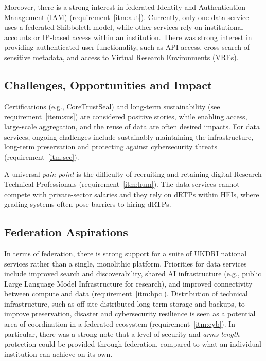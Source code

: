 \documentclass[11pt]{scrartcl}
\begin{document}
Moreover, there is a strong interest in federated Identity and Authentication Management (IAM) (requirement~\ref{itm:aut}). Currently, only one data service uses a federated Shibboleth model, while other services rely on institutional accounts or IP-based access within an institution. There was strong interest in providing authenticated user functionality, such as API access, cross-search of sensitive metadata, and access to Virtual Research Environments (VREs).

\subsection{Challenges, Opportunities and Impact}
Certifications (e.g., CoreTrustSeal) and long-term sustainability (see requirement~\ref{item:sus}) are considered positive stories, while enabling access, large-scale aggregation, and the reuse of data are often desired impacts.  For data services, ongoing challenges include sustainably maintaining the infrastructure, long-term preservation and protecting against cybersecurity threats (requirement~\ref{itm:sec}).

A universal \emph{pain point} is the difficulty of recruiting and retaining digital Research Technical Professionals (requirement~\ref{itm:hum}). The data services cannot compete with private-sector salaries and they rely on dRTPs within HEIs, where grading systems often pose barriers to hiring dRTPs. 

\subsection{Federation Aspirations}
In terms of federation, there is strong support for a suite of UKDRI national services rather than a single, monolithic platform. Priorities for data services include improved search and discoverability, shared AI infrastructure (e.g., public Large Language Model Infrastructure for research), and improved connectivity between compute and data (requirement~\ref{itm:hpc}). Distribution of technical infrastructure, such as off-site distributed long-term storage and backups, to improve preservation, disaster and cybersecurity resilience is seen as a potential area of coordination in a federated ecosystem (requirement~\ref{itm:cyb}).
In particular, there was a strong note that a level of security and \emph{arms-length} protection could be provided through federation, compared to what an individual institution can achieve on its own. 
\end{document}
